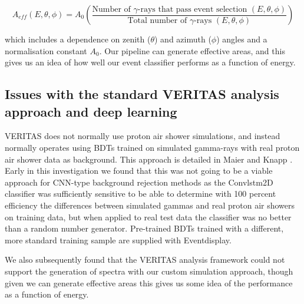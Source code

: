 \begin{equation}
    A_{eff}(E,\theta,\phi)=A_0\left(\frac{\textrm{Number of }\gamma\textrm{-rays that pass event selection }(E,\theta,\phi)}{\textrm{Total number of }\gamma\textrm{-rays }(E,\theta,\phi)}\right)
\end{equation}

which includes a dependence on zenith ($\theta$) and azimuth ($\phi$) angles and a normalisation constant $A_0$. Our pipeline can generate effective areas, and this gives us an idea of how well our event classifier performs as a function of energy.

\subsection{Issues with the standard VERITAS analysis approach and deep learning}
VERITAS does not normally use proton air shower simulations, and instead normally operates using BDTs trained on simulated gamma-rays with real proton air shower data as background. This approach is detailed in Maier and Knapp \cite{maierknapp}. Early in this investigation we found that this was not going to be a viable approach for CNN-type background rejection methods as the Convlstm2D classifier was sufficiently sensitive to be able to determine with 100 percent efficiency the differences between simulated gammas and real proton air showers on training data, but when applied to real test data the classifier was no better than a random number generator. Pre-trained BDTs trained with a different, more standard training sample are supplied with Eventdisplay.

We also subsequently found that the VERITAS analysis framework could not support the generation of spectra with our custom simulation approach, though given we can generate effective areas this gives us some idea of the performance as a function of energy.

